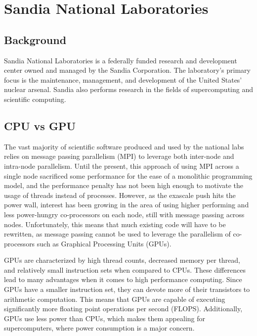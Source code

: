 
\chapter{Sandia National Laboratories}

\section{Background}

Sandia National Laboratories is a federally funded research and development
center owned and managed by the Sandia Corporation.  The laboratory's primary
focus is the maintenance, management, and development of the United States'
nuclear arsenal.  Sandia also performs research in the fields of supercomputing
and scientific computing. 


\section{CPU vs GPU}
The vast
majority of scientific software produced and used by the national labs relies on
message passing parallelism (MPI) to leverage both inter-node and intra-node
parallelism.  
Until the present, this approach of using MPI across a single node
sacrificed some performance for the ease of a monolithic programming model, and
the performance penalty has not been high enough to motivate the usage of
threads instead of processes.  However, as the exascale push hits the power
wall, interest has been growing in the area of using higher performing and less
power-hungry co-processors on each node, still with message passing across
nodes.  Unfortunately, this means that much existing code will have to be rewritten, as
message passing cannot be used to leverage the parallelism of co-processors such
as Graphical Processing Units (GPUs).

GPUs are characterized by high thread counts, decreased memory per thread, and
relatively small instruction sets when compared to CPUs. These differences lead
to many advantages when it comes to high performance computing. Since GPUs have
a smaller instruction set, they can devote more of their transistors to
arithmetic computation. This means that GPUs are capable of executing
significantly more floating point operations per second (FLOPS). Additionally,
GPUs use less power than CPUs, which makes them appealing for supercomputers,
where power consumption is a major concern.

